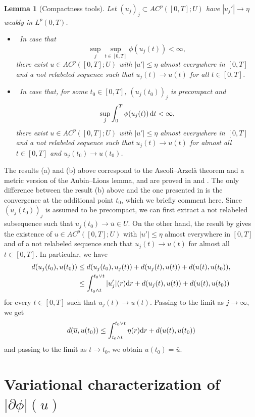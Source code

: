 \documentclass[reqno]{amsart}
\newcommand{\ove}{\overline}
\renewcommand{\sl}{|\partial \phi|}
\renewcommand{\d}{{\rm d}}
\newtheorem{lemma}[theorem]{Lemma}
\begin{document}
\begin{lemma}[Compactness tools] \label{lemma:compactness} Let $ (u_j)_j \subset  AC^p([0,T];U)$ have
  $|u_j'|\to \eta$ weakly in $L^p(0,T)$.  
  \begin{itemize}
  \item[\rm (a)] \ In case that $$\sup_j \sup_{t \in [0,T]} \phi(u_j(t))<\infty,$$
    there  exist $u \in AC^p([0,T];U)$  with $|u'| \leq \eta$ almost everywhere in
    $[0,T]$  and  a not relabeled sequence such that $u_j(t)\to u(t)$
    for all $t\in [0,T]$.
     \item[\rm (b)] \ In case that, for some $t_0 \in [0,T]$,
       $(u_j(t_0))_j$ is  precompact  and  $$\sup_j\int_0^T \phi(u_j(t))\, \d t<\infty,$$
     there  exist $u \in AC^p([0,T];U)$  with $|u'| \leq \eta$ almost everywhere in
    $[0,T]$   and  a not relabeled sequence such that $u_j(t)\to u(t)$
    for almost all $t\in [0,T]$  and $u_j(t_0) \to u(t_0)$.
  \end{itemize}
\end{lemma}
 The results (a) and (b) above correspond to
  the Ascoli--Arzel\`a theorem  and  a metric version of the Aubin--Lions lemma,   and are proved in
\cite[Prop. 3.3.1]{Ambrosio08} and \cite[Thm.~2]{Rossi-Savare}. 
The only difference between the result (b) above and the one presented
in \cite[Thm.~2]{Rossi-Savare} is the convergence at the additional
point $t_0$, which we briefly comment here. Since $(u_j(t_0))_j$ is
assumed to be  precompact,  we can first extract a not
relabeled subsequence such that $u_j(t_0) \to  \ove u \in U$. 
On the other hand, the result by \cite[Thm.~2]{Rossi-Savare} gives the
existence of $u \in AC^p([0,T];U)$   with $|u'| \leq \eta$ almost
everywhere in $[0,T]$  and  of  a not relabeled sequence such that $u_j(t)\to u(t)$ for almost all $t\in [0,T]$. In particular, we have
\begin{align*}
d(u_j(t_0), u(t_0)) &\le d(u_j(t_0), u_j(t)) + d(u_j(t), u(t))+d(u(t), u(t_0)),
\\
& \le \int_{t_0 \wedge t}^{t_0 \vee t} |u'_j|(r) \d r + d(u_j(t), u(t)) + d(u(t), u(t_0))
\end{align*}
for every $t \in [0,T]$ such that $u_j(t) \to u(t)$. Passing to the limit as $j \to \infty$, we get
\[
d( \ove u  , u(t_0))  \leq   \int_{t_0 \wedge t}^{t_0 \vee t} \eta(r) \d r + d(u(t), u(t_0))
\]
and passing to the limit as $t \to t_0$, we obtain $u(t_0)= \ove u$.


\section{Variational characterization of $\sl(u)$}\label{sec:var}
\end{document}
